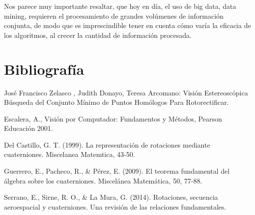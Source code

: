 \documentclass[spanish]{article}
\begin{document}
  Nos parece muy importante resaltar, que hoy en día, el uso de big data, data mining, requieren el procesamiento de grandes volúmenes de información conjunta, de modo que es imprescindible tener en cuenta cómo varía la eficacia de los algoritmos, al crecer la cantidad de información procesada.
  


\clearpage
  \section{Bibliograf\'ia}

  \begin{thebibliography}{99} 
  
  José Francisco Zelasco , Judith Donayo, Teresa Arcomano: Visión Estereoscópica Búsqueda del Conjunto Mínimo de Puntos Homólogos Para Rotorectificar.
  
  Escalera, A., Visión por Computador: Fundamentos y Métodos, Pearson Educación 2001.
  
  Del Castillo, G. T. (1999). La representación de rotaciones mediante cuaterniones. Miscelanea Matemtica, 43-50.
  
  Guerrero, E., Pacheco, R., & Pérez, E. (2009). El teorema fundamental del álgebra sobre los cuaterniones. Miscelánea Matemática, 50, 77-88.
  
  Serrano, E., Sirne, R. O., & La Mura, G. (2014). Rotaciones, secuencia aeroespacial y cuaterniones. Una revisión de las relaciones fundamentales.

  \end{thebibliography}
\end{document}
